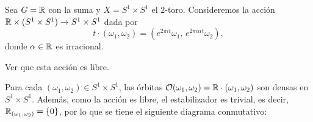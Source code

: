 \noindent
\begin{minipage}[t]{0.72\textwidth}
\begin{ejemplo}
Sea $G = \mathbb{R}$ con la suma y $X = S^1 \times S^1$ el $2$-toro. Consideremos la acción $\mathbb{R} \times (S^1 \times S^1) \to S^1 \times S^1$ dada por
\[
t \cdot (\omega_1, \omega_2) = \left(e^{2\pi i t}\omega_1, \, e^{2\pi i \alpha t}\omega_2\right),
\]
donde $\alpha \in \mathbb{R}$ es irracional.
\end{ejemplo}

\begin{ejercicio}
Ver que esta acción es libre.
\end{ejercicio}
\end{minipage}%
\hfill
\begin{minipage}[t]{0.24\textwidth}
\vspace{0pt}
\centering
{}
\end{minipage}

\medskip

Para cada $(\omega_1, \omega_2) \in S^1 \times S^1$, las órbitas $\mathcal{O}(\omega_1, \omega_2) = \mathbb{R} \cdot (\omega_1, \omega_2)$ son densas en $S^1 \times S^1$. Además, como la acción es libre, el estabilizador es trivial, es decir, $\mathbb{R}_{(\omega_1, \omega_2)} = \{0\}$, por lo que se tiene el siguiente diagrama conmutativo:


